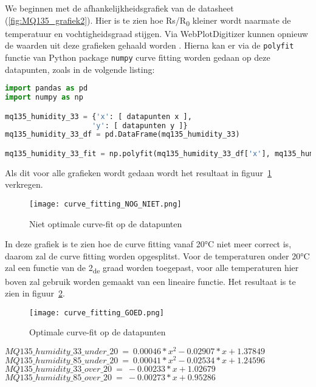 We beginnen met de afhankelijkheidsgrafiek van de datasheet (\ref{fig:MQ135_grafiek2}). Hier is te zien hoe Rs/R\textsubscript{0} kleiner wordt naarmate de temperatuur en vochtigheidsgraad stijgen. Via WebPlotDigitizer kunnen opnieuw de waarden uit deze grafieken gehaald worden
. Hierna kan er via de \verb|polyfit| functie van Python package \verb|numpy| curve fitting worden gedaan op deze datapunten, zoals in de volgende listing:
\begin{lstlisting}[language=Python, caption={Curve fitting in Python}]
import pandas as pd
import numpy as np

mq135_humidity_33 = {'x': [ datapunten x ],
                    'y': [ datapunten y ]}
mq135_humidity_33_df = pd.DataFrame(mq135_humidity_33)

mq135_humidity_33_fit = np.polyfit(mq135_humidity_33_df['x'], mq135_humidity_33_df['y'], 2) #functie van de 2de graad

\end{lstlisting}

Als dit voor alle grafieken wordt gedaan wordt het resultaat in figuur~\ref{fig:curve_fitting_NOG_NIET} verkregen.

\begin{figure}[h]
    \texttt{[image: curve\_fitting\_NOG\_NIET.png]}
    \caption[Niet optimale curve-fit op de datapunten]{Niet optimale curve-fit op de datapunten}
    \label{fig:curve_fitting_NOG_NIET}
\end{figure}

In deze grafiek is te zien hoe de curve fitting vanaf 20°C niet meer correct is, daarom zal de curve fitting worden opgesplitst. Voor de temperaturen onder 20°C zal een functie van de 2\textsubscript{de} graad worden toegepast, voor alle temperaturen hier boven zal gebruik worden gemaakt van een lineaire functie. Het resultaat is te zien in figuur~\ref{fig:curve_fitting_GOED}.

\begin{figure}[h]
    \texttt{[image: curve\_fitting\_GOED.png]}
    \caption[Optimale curve-fit op de datapunten]{Optimale curve-fit op de datapunten}
    \label{fig:curve_fitting_GOED}
\end{figure}

\(MQ135\_humidity\_33\_under\_20\ =\ 0.00046 * x^2 - 0.02907 * x + 1.37849\) \\
\(MQ135\_humidity\_85\_under\_20\ =\ 0.00041 * x^2 - 0.02534 * x + 1.24596\) \\
\(MQ135\_humidity\_33\_over\_20\ =\ -0.00233 * x + 1.02679\) \\
\(MQ135\_humidity\_85\_over\_20\ =\ -0.00273 * x + 0.95286\)

